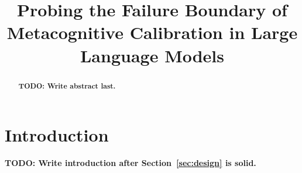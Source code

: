 \documentclass{article}
\title{Probing the Failure Boundary of Metacognitive Calibration in Large Language Models}
\author{%
}
\begin{document}
\maketitle

\begin{abstract}

	\textbf{TODO: Write abstract last.}
\end{abstract}


\section{Introduction}
%
%
%
%
%

\textbf{TODO: Write introduction after Section~\ref{sec:design} is solid.}
\end{document}
